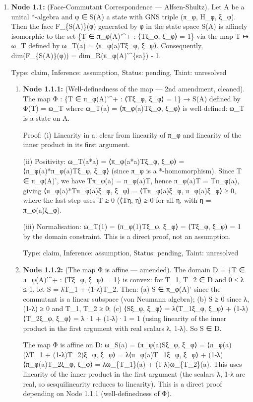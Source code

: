 \documentclass{article}
\begin{document}
\begin{enumerate}
\item \textbf{Node 1.1:} (Face-Commutant Correspondence — Alfsen-Shultz). Let A be a unital *-algebra and φ ∈ S(A) a state with GNS triple (π\_φ, H\_φ, ξ\_φ). Then the face F\_\{S(A)\}(φ) generated by φ in the state space S(A) is affinely isomorphic to the set \{T ∈ π\_φ(A)'\textasciicircum{}+ : ⟨Tξ\_φ, ξ\_φ⟩ = 1\} via the map T ↦ ω\_T defined by ω\_T(a) = ⟨π\_φ(a)Tξ\_φ, ξ\_φ⟩. Consequently, dim(F\_\{S(A)\}(φ)) = dim\_R(π\_φ(A)'\textasciicircum{}\{sa\}) - 1.

  Type: claim, Inference: assumption, Status: pending, Taint: unresolved

\begin{enumerate}
\item \textbf{Node 1.1.1:} (Well-definedness of the map — 2nd amendment, cleaned). The map Φ : \{T ∈ π\_φ(A)'\textasciicircum{}+ : ⟨Tξ\_φ, ξ\_φ⟩ = 1\} → S(A) defined by Φ(T) = ω\_T where ω\_T(a) = ⟨π\_φ(a)Tξ\_φ, ξ\_φ⟩ is well-defined: ω\_T is a state on A.

Proof: (i) Linearity in a: clear from linearity of π\_φ and linearity of the inner product in its first argument.

(ii) Positivity: ω\_T(a*a) = ⟨π\_φ(a*a)Tξ\_φ, ξ\_φ⟩ = ⟨π\_φ(a)*π\_φ(a)Tξ\_φ, ξ\_φ⟩ (since π\_φ is a *-homomorphism). Since T ∈ π\_φ(A)', we have Tπ\_φ(a) = π\_φ(a)T, hence π\_φ(a)T = Tπ\_φ(a), giving ⟨π\_φ(a)*Tπ\_φ(a)ξ\_φ, ξ\_φ⟩ = ⟨Tπ\_φ(a)ξ\_φ, π\_φ(a)ξ\_φ⟩ ≥ 0, where the last step uses T ≥ 0 (⟨Tη, η⟩ ≥ 0 for all η, with η = π\_φ(a)ξ\_φ).

(iii) Normalisation: ω\_T(1) = ⟨π\_φ(1)Tξ\_φ, ξ\_φ⟩ = ⟨Tξ\_φ, ξ\_φ⟩ = 1 by the domain constraint. This is a direct proof, not an assumption.

  Type: claim, Inference: assumption, Status: pending, Taint: unresolved

\item \textbf{Node 1.1.2:} (The map Φ is affine — amended). The domain D = \{T ∈ π\_φ(A)'\textasciicircum{}+ : ⟨Tξ\_φ, ξ\_φ⟩ = 1\} is convex: for T\_1, T\_2 ∈ D and 0 ≤ λ ≤ 1, let S = λT\_1 + (1-λ)T\_2. Then: (a) S ∈ π\_φ(A)' since the commutant is a linear subspace (von Neumann algebra); (b) S ≥ 0 since λ, (1-λ) ≥ 0 and T\_1, T\_2 ≥ 0; (c) ⟨Sξ\_φ, ξ\_φ⟩ = λ⟨T\_1ξ\_φ, ξ\_φ⟩ + (1-λ)⟨T\_2ξ\_φ, ξ\_φ⟩ = λ·1 + (1-λ)·1 = 1 (using linearity of the inner product in the first argument with real scalars λ, 1-λ). So S ∈ D.

The map Φ is affine on D: ω\_S(a) = ⟨π\_φ(a)Sξ\_φ, ξ\_φ⟩ = ⟨π\_φ(a)(λT\_1 + (1-λ)T\_2)ξ\_φ, ξ\_φ⟩ = λ⟨π\_φ(a)T\_1ξ\_φ, ξ\_φ⟩ + (1-λ)⟨π\_φ(a)T\_2ξ\_φ, ξ\_φ⟩ = λω\_\{T\_1\}(a) + (1-λ)ω\_\{T\_2\}(a). This uses linearity of the inner product in the first argument (the scalars λ, 1-λ are real, so sesquilinearity reduces to linearity). This is a direct proof depending on Node 1.1.1 (well-definedness of Φ).


\end{enumerate}
\end{enumerate}
\end{document}
